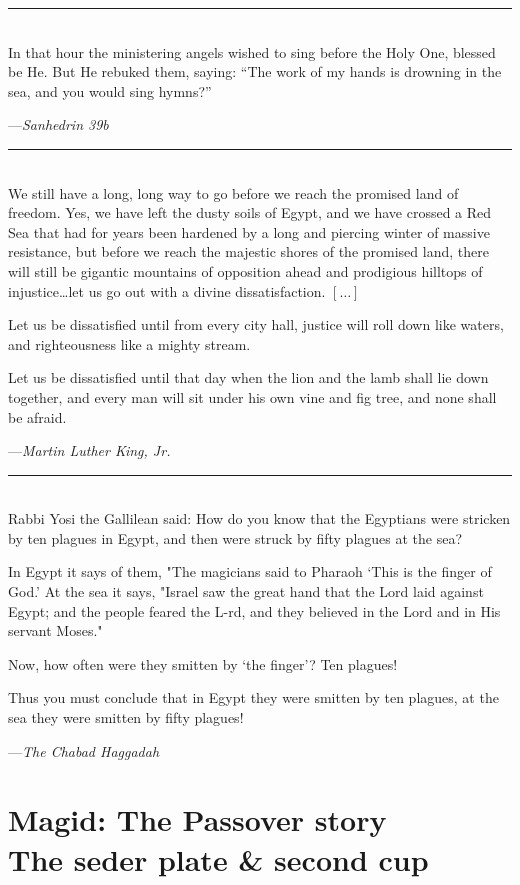 \documentclass[a4paper,10pt,openany]{memoir}
\newcommand{\HgEllipsis}{\ensuremath{\left[\ldots\right]}}
\newcommand{\HgSource}[1]{\hfill{\small---\itshape{#1}}}
\newcommand{\HgFill}{\vfill \hrule \vfill}
\newenvironment{HgEnglish}{\strut\\\noindent}{\vspace{1em}}
\begin{document}
\HgFill

\begin{HgEnglish}
  In that hour the ministering angels wished to sing before the Holy One,
  blessed be He. But He rebuked them, saying: ``The work of my hands is drowning
  in the sea, and you would sing hymns?''
  
  \HgSource{Sanhedrin 39b}
\end{HgEnglish}

\HgFill

\begin{HgEnglish}
We still have a long, long way to go before we reach the promised land of
freedom. Yes, we have left the dusty soils of Egypt, and we have crossed a Red
Sea that had for years been hardened by a long and piercing winter of massive
resistance, but before we reach the majestic shores of the promised land, there
will still be gigantic mountains of opposition ahead and prodigious hilltops of
injustice\ldots{}let us go out with a divine dissatisfaction. \HgEllipsis

Let us be dissatisfied until from every city hall, justice will roll down like
waters, and righteousness like a mighty
stream.

Let us be dissatisfied until that day when the lion and the lamb shall lie down
together, and every man will sit under
his own vine and fig tree, and none shall be afraid.

\HgSource{Martin Luther King, Jr.}
\end{HgEnglish}

\HgFill

\begin{HgEnglish}
Rabbi Yosi the Gallilean said: How do you know that the Egyptians were stricken
by ten plagues in Egypt, and then were struck by fifty plagues at the sea?

In Egypt it says of them, "The magicians said to Pharaoh `This is the finger of
God.' At the sea it says, "Israel saw the great hand that the Lord laid against
Egypt; and the people feared the L-rd, and they believed in the Lord and in His
servant Moses."

Now, how often were they smitten by `the finger'? Ten plagues!

Thus you must conclude that in Egypt they were smitten by ten plagues, at the
sea they were smitten by fifty plagues!

\HgSource{The Chabad Haggadah}
\end{HgEnglish}

\chapter{Magid: The Passover story\\ {\LARGE The seder plate \& second cup}}
\vspace{-2em}
\end{document}
